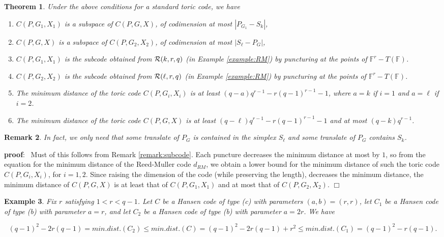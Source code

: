 \documentclass[12pt]{article}
\newtheorem{theorem}{Theorem}[section]
\newtheorem{example}[theorem]{Example}
\newtheorem{remark}[theorem]{Remark}
\def\pf{{\bf proof}:\ }
\def\qed{$\Box$}
\def\fff{\mathbb{F}}
\begin{document}
\begin{theorem}
\label{thrm:subcode2}
Under the above conditions for a standard toric code,
we have

\begin{enumerate}
\item
$C(P,G_1,X_1)$ is a subspace of $C(P,G,X)$, of codimension
at most $|P_{G_1} - S_k|$,

\item
$C(P,G,X)$ is a subspace of $C(P,G_2,X_2)$, of codimension
at most $|S_\ell - P_G|$,

\item
$C(P,G_1,X_1)$ is the subcode obtained
from ${\cal R}(k,r,q)$ (in Example \ref{example:RM})
by puncturing at the points of $\fff^r -T(\fff) $.

\item
$C(P,G_2,X_2)$ is the subcode obtained
from ${\cal R}(\ell,r,q)$ (in Example \ref{example:RM})
by puncturing at the points of $\fff^r -T(\fff) $.

\item
The minimum distance of the toric code
$C(P,G_i,X_i)$ is at least $(q-a)q^{r-1}-r(q-1)^{r-1}-1$,
where $a=k$ if $i=1$ and $a=\ell$ if $i=2$.

\item
The minimum distance of the toric code
$C(P,G,X)$ is at least $(q-\ell)q^{r-1}-r(q-1)^{r-1}-1$
and at most $(q-k)q^{r-1}$.
\end{enumerate}
\end{theorem}

\begin{remark}
In fact, we only need that {\it some translate} of
$P_G$ is contained in the simplex 
$S_\ell$ and some translate of $P_G$ contains $S_k$.
\end{remark}

\pf
Must of this follows from Remark \ref{remark:subcode}.
Each puncture decreases the minimum distance at most by 
$1$, so from the equation for the minimum distance
of the Reed-Muller code $d_{RM}$, we obtain a lower
bound for the minimum distance of such the toric code
$C(P,G_i,X_i)$, for $i=1,2$. Since raising the dimension of the 
code (while preserving the length), decreases the 
minimum distance, the minimum distance of 
$C(P,G,X)$ is at least that of $C(P,G_1,X_1)$ and
at most that of $C(P,G_2,X_2)$.
\qed

\begin{example}
Fix $r$ satisfying $1<r<q-1$. Let $C$ be a Hansen code of type (c) with parameters
$(a,b)=(r,r)$, let $C_1$ be a Hansen code of type (b) with parameter
$a=r$, and  let $C_2$ be a Hansen code of type (b) with parameter
$a=2r$. We have 

\[
(q-1)^2-2r(q-1) = min.dist. (C_2)
 \leq min.dist. (C)=(q-1)^2-2r(q-1)+r^2\leq min.dist. (C_1)=(q-1)^2-r(q-1).
\]
\end{example}
\end{document}
